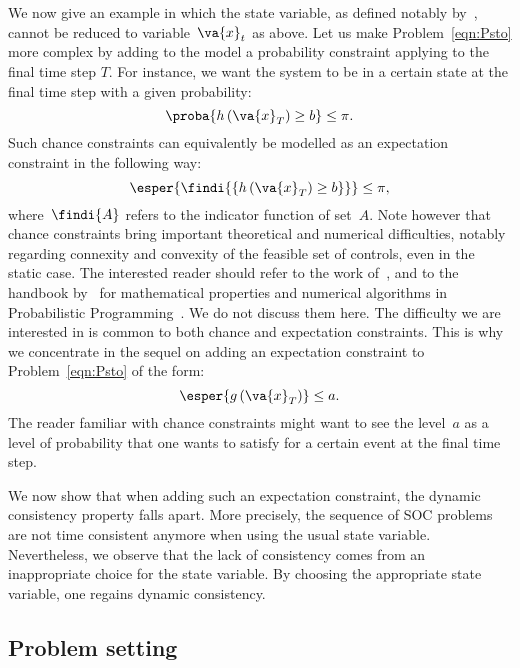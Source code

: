\documentclass[a4paper]{amsart}
\theoremstyle{plain}
\theoremstyle{definition}
\theoremstyle{remark}
\begin{document}
We now give an example in which the state variable, as defined
notably by~\citet{Whittle}, cannot be reduced to
variable~$\va{x}_t$ as above. Let us make Problem~\eqref{eqn:Psto}
more complex by adding to the model a probability constraint
applying to the final time step $T$. For instance, we want the
system to be in a certain state at the final time step with a
given probability:
\begin{equation*}
    \proba{h\left(\va{x}_T\right) \geq b} \leq
    \pi .
\end{equation*}
Such chance constraints can equivalently be modelled as an
expectation constraint in the following way:
\begin{equation*}
    \esper{\findi{\left\{h\left(\va{x}_T\right) \geq b\right\}}} \leq \pi,
\end{equation*}
where~$\findi{A}$ refers to the indicator function of set~$A$.
Note however that chance constraints bring important theoretical
and numerical difficulties, notably regarding connexity and
convexity of the feasible set of controls, even in the static
case. The interested reader should refer to the work
of~\citet{PrekopaStoProg}, and to the handbook
by~\citet[Ch.5]{StochasticProgramming03} for mathematical
properties and numerical algorithms in Probabilistic
Programming~\citep[see also][for related
studies]{Henrion02,HenrionStrugarek06}. We do not discuss them
here. The difficulty we are interested in is common to both chance
and expectation constraints. This is why we concentrate in the
sequel on adding an expectation constraint to
Problem~\eqref{eqn:Psto} of the form:
\begin{equation*}
    \esper{g\left(\va{x}_T\right)} \leq a. \label{eqn:Constraint}
\end{equation*}
The reader familiar with chance constraints might want to see the
level~$a$ as a level of probability that one wants to satisfy for
a certain event at the final time step.

We now show that when adding such an expectation constraint, the
dynamic consistency property falls apart. More precisely, the
sequence of SOC problems are not time consistent anymore when
using the usual state variable. Nevertheless, we observe that the
lack of consistency comes from an inappropriate choice for the
state variable. By choosing the appropriate state variable, one
regains dynamic consistency.

\subsection{Problem setting} \label{ssec:ProblemSetting}
\end{document}
